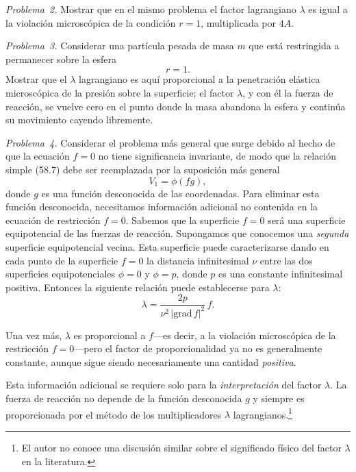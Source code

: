 \documentclass[12pt,a4paper]{book}
\begin{document}
\textit{Problema~2.} Mostrar que en el mismo problema el factor lagrangiano $\lambda$ es igual a la violación microscópica de la condición $r = 1$, multiplicada por $4A$.


\textit{Problema~3.} Considerar una partícula pesada de masa $m$ que está restringida a permanecer sobre la esfera
\[
r = 1.
\]
Mostrar que el $\lambda$ lagrangiano es aquí proporcional a la penetración elástica microscópica de la presión sobre la superficie; el factor $\lambda$, y con él la fuerza de reacción, se vuelve cero en el punto donde la masa abandona la esfera y continúa su movimiento cayendo libremente.

\textit{Problema~4.} Considerar el problema más general que surge debido al hecho de que la ecuación $f = 0$ no tiene significancia invariante, de modo que la relación simple (58.7) debe ser reemplazada por la suposición más general
\begin{equation}
V_1 = \phi(fg), \tag{58.18}
\end{equation}
donde $g$ es una función desconocida de las coordenadas. Para eliminar esta función desconocida, necesitamos información adicional no contenida en la ecuación de restricción $f = 0$. Sabemos que la superficie $f = 0$ será una superficie equipotencial de las fuerzas de reacción. Supongamos que conocemos una \textit{segunda} superficie equipotencial vecina. Esta superficie puede caracterizarse dando en cada punto de la superficie $f = 0$ la distancia infinitesimal $\nu$ entre las dos superficies equipotenciales $\phi = 0$ y $\phi = p$, donde $p$ es una constante infinitesimal positiva. Entonces la siguiente relación puede establecerse para $\lambda$:
\begin{equation}
\lambda = \frac{2p}{\nu^2\,|\text{grad}\,f|^2}\,f. \tag{58.19}
\end{equation}

Una vez más, $\lambda$ es proporcional a $f$---es decir, a la violación microscópica de la restricción $f = 0$---pero el factor de proporcionalidad ya no es generalmente constante, aunque sigue siendo necesariamente una cantidad \textit{positiva}.

Esta información adicional se requiere solo para la \textit{interpretación} del factor $\lambda$. La fuerza de reacción no depende de la función desconocida $g$ y siempre es proporcionada por el método de los multiplicadores $\lambda$ lagrangianos.\footnote{El autor no conoce una discusión similar sobre el significado físico del factor $\lambda$ en la literatura.}
\end{document}
